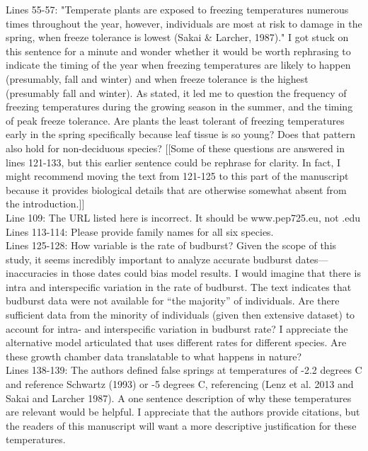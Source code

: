 \documentclass[11pt,a4paper]{article}
\begin{document}
Lines 55-57: "Temperate plants are exposed to freezing temperatures numerous times throughout the year, however, individuals are most at risk to damage in the spring, when freeze tolerance is lowest (Sakai \& Larcher, 1987)." I got stuck on this sentence for a minute and wonder whether it would be worth rephrasing to indicate the timing of the year when freezing temperatures are likely to happen (presumably, fall and winter) and when freeze tolerance is the highest (presumably fall and winter). As stated, it led me to question the frequency of freezing temperatures during the growing season in the summer, and the timing of peak freeze tolerance. Are plants the least tolerant of freezing temperatures early in the spring specifically because leaf tissue is so young? Does that pattern also hold for non-deciduous species? [[Some of these questions are answered in lines 121-133, but this earlier sentence could be rephrase for clarity. In fact, I might recommend moving the text from 121-125 to this part of the manuscript because it provides biological details that are otherwise somewhat absent from the introduction.]]\\

Line 109: The URL listed here is incorrect. It should be www.pep725.eu, not .edu\\

Lines 113-114: Please provide family names for all six species.\\

Lines 125-128: How variable is the rate of budburst? Given the scope of this study, it seems incredibly important to analyze accurate budburst dates---inaccuracies in those dates could bias model results. I would imagine that there is intra\- and interspecific variation in the rate of budburst. The text indicates that budburst data were not available for “the majority” of individuals. Are there sufficient data from the minority of individuals (given then extensive dataset) to account for intra- and interspecific variation in budburst rate? I appreciate the alternative model articulated that uses different rates for different species. Are these growth chamber data translatable to what happens in nature?\\

Lines 138-139: The authors defined false springs at temperatures of -2.2 degrees C and reference Schwartz (1993) or -5 degrees C, referencing (Lenz et al. 2013 and Sakai and Larcher 1987). A one sentence description of why these temperatures are relevant would be helpful. I appreciate that the authors provide citations,  but the readers of this manuscript will want a more descriptive justification for these temperatures.\\
\end{document}
